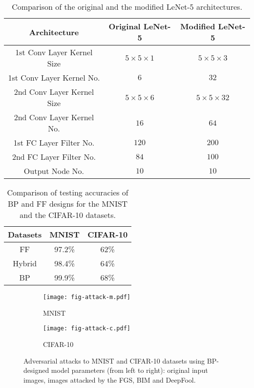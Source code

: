 \documentclass[preprint,12pt]{elsarticle}
\begin{document}
\begin{table}[htb]
\begin{center}
\begin{tabular}{|c|c|c|} \hline
Architecture     & Original LeNet-5  & Modified LeNet-5 \\ \hline
1st Conv Layer Kernel Size & $5 \times 5 \times 1$   &  $5 \times 5 \times 3$      \\ \hline
1st Conv Layer Kernel No.  & $6$  &  $32$     \\ \hline
2nd Conv Layer Kernel Size & $5 \times 5 \times 6$   &  $5 \times 5 \times 32$      \\ \hline
2nd Conv Layer Kernel No.  & $16$  & $64$  \\ \hline
1st FC Layer Filter No.    & $120$ & $200$ \\ \hline
2nd FC Layer Filter No.    & $84$  & $100$ \\ \hline
Output Node No.            & $10$  & $10$  \\ \hline
\end{tabular}
\end{center}
\caption{Comparison of the original and the modified LeNet-5
architectures.}\label{table:mLeNet-5}
\end{table}

\begin{table}[htb]
\begin{center}
\begin{tabular}{|c|c|c|} \hline
Datasets  &     MNIST   & CIFAR-10  \\ \hline
FF        &    97.2\%  &  62\%  \\ \hline
Hybrid    &    98.4\%  &  64\%  \\ \hline
BP        &    99.9\%  &  68\%  \\ \hline
\end{tabular}
\end{center}
\caption{Comparison of testing accuracies of BP and FF designs
for the MNIST and the CIFAR-10 datasets.}\label{table:classification}
\end{table}

\begin{figure}[htb]
\centering
\begin{subfigure}[b]{0.4\linewidth}
\centering
\texttt{[image: fig-attack-m.pdf]}
\caption{MNIST}
\end{subfigure}
\begin{subfigure}[b]{0.4\linewidth}
\centering
\texttt{[image: fig-attack-c.pdf]}
\caption{CIFAR-10}
\end{subfigure}
\caption{Adversarial attacks to MNIST and CIFAR-10 datasets using
BP-designed model parameters (from left to right): original input
images, images attacked by the FGS, BIM and DeepFool.}\label{fig:attack}
\end{figure}
\end{document}
